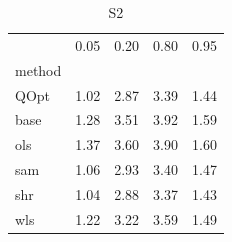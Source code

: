 \begin{table}
\caption{S2}
\label{ }
\begin{tabular}{lrrrr}
\toprule
 & 0.05 & 0.20 & 0.80 & 0.95 \\
method &  &  &  &  \\
\midrule
QOpt & 1.02 & 2.87 & 3.39 & 1.44 \\
base & 1.28 & 3.51 & 3.92 & 1.59 \\
ols & 1.37 & 3.60 & 3.90 & 1.60 \\
sam & 1.06 & 2.93 & 3.40 & 1.47 \\
shr & 1.04 & 2.88 & 3.37 & 1.43 \\
wls & 1.22 & 3.22 & 3.59 & 1.49 \\
\bottomrule
\end{tabular}
\end{table}
